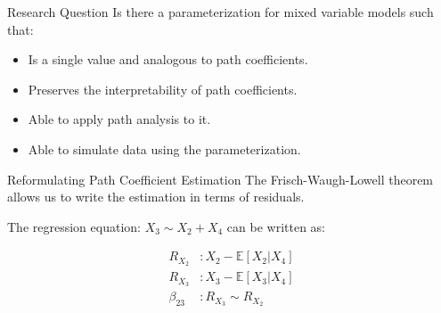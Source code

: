 \documentclass{beamer}
\begin{document}
% 
% 
% 

\begin{frame}{Research Question}
	Is there a parameterization for mixed variable models such that:
	\begin{itemize}
		\item Is a single value and analogous to path coefficients.
		\item Preserves the interpretability of path coefficients.
		\item Able to apply path analysis to it.
		\item Able to simulate data using the parameterization.
	\end{itemize}
\end{frame}

\begin{frame}{Reformulating Path Coefficient Estimation}
	The Frisch-Waugh-Lowell theorem allows us to write the estimation in
	terms of residuals. 

	The regression equation: $ X_3 \sim X_2 + X_4 $ can
	be written as:

	\begin{equation*}
		\begin{split}
			R_{X_2}&: X_2 - \mathbb{E}[X_2 | X_4] \\
			R_{X_3}&: X_3 - \mathbb{E}[X_3 | X_4] \\
			\beta_{23}&: R_{X_3} \sim R_{X_2} \\
		\end{split}
	\end{equation*}
\end{frame}
\end{document}
